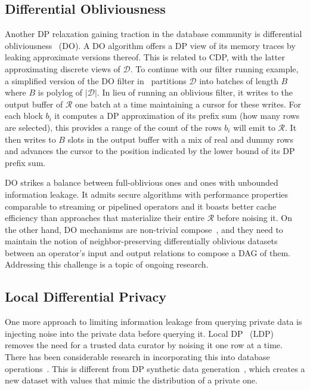 \documentclass[11pt]{article}
\newcommand{\db}{$\mathcal{D}$\xspace}
\newcommand{\answer}{$\mathcal{R}$\xspace}
\begin{document}
\subsection{Differential Obliviousness}
 Another DP relaxation gaining traction in the database community is differential obliviousness~\cite{chan2022foundations,chu2021differentially, qin2022adore, qiu2023doquet} (DO).   A DO algorithm offers a DP view of its memory traces by leaking approximate versions thereof.   This is related to CDP, with the latter approximating discrete views of \db.  To continue with our filter running example, a simplified version of the DO filter in~\cite{qin2022adore} partitions \db into batches of length $B$ where $B$ is polylog of $|$\db$|$. In lieu of running an oblivious filter, it writes to the output buffer of \answer one batch at a time maintaining a cursor for these writes.  For each block $b_i$ it computes a DP approximation of its prefix sum (how many rows are selected), this provides a range of the count of the rows $b_i$ will emit to \answer.  It then writes to $B$ slots in the output buffer with a mix of real and dummy rows and advances the cursor to the position indicated by the lower bound of its DP prefix sum. 
 
 DO strikes a balance between full-oblivious ones and ones with unbounded information leakage.   It admits secure algorithms with performance properties comparable to streaming or pipelined operators and it boasts better cache efficiency than approaches that materialize their entire \answer before noising it.     On the other hand, DO mechanisms are non-trivial compose~\cite{zhou2023theory}, and they need to maintain the notion of neighbor-preserving differentially oblivious datasets between an operator's input and output relations to compose a DAG of them.  Addressing this challenge is a topic of ongoing research.

\subsection{Local Differential Privacy}

  One more approach to limiting information leakage from querying private data is injecting noise into the private data before querying it.  Local DP~\cite{xiong2020comprehensive} (LDP) removes the need for a trusted data curator by noising it one row at a time.  There has been considerable research in incorporating this into database operations~\cite{cormode2018privacy,gu2019supporting,roth2020orchard,wang2017locally,xu13collecting}.  This is different from DP synthetic data generation~\cite{cai2023privlava,ge2021kamino,machanavajjhala2008privacy}, which creates a new dataset with values that mimic the distribution of a private one.  
\end{document}
